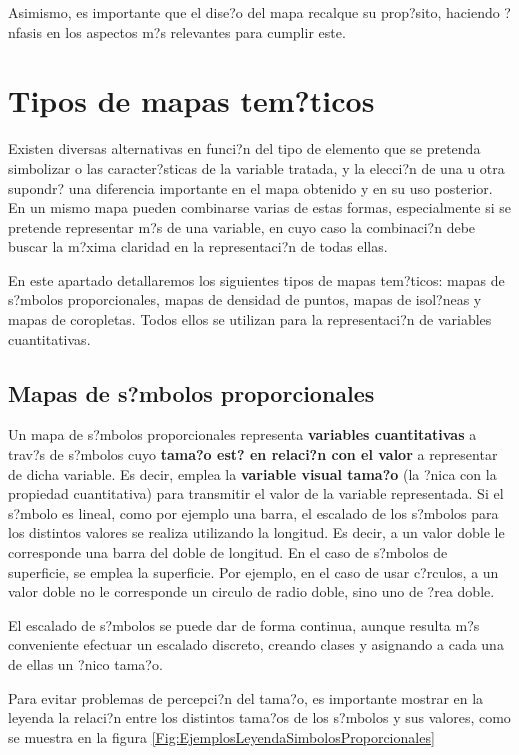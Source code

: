 Asimismo, es importante que el dise?o del mapa recalque su prop?sito, haciendo ?nfasis en los aspectos m?s relevantes para cumplir este.


\section{Tipos de mapas tem?ticos}

Existen diversas alternativas en funci?n del tipo de elemento que se pretenda simbolizar o las caracter?sticas de la variable tratada, y la elecci?n de una u otra supondr? una diferencia importante en el mapa obtenido y en su uso posterior. En un mismo mapa pueden combinarse varias de estas formas, especialmente si se pretende representar m?s de una variable, en cuyo caso la combinaci?n debe buscar la m?xima claridad en la representaci?n de todas ellas.

En este apartado detallaremos los siguientes tipos de mapas tem?ticos: mapas de s?mbolos proporcionales, mapas de densidad de puntos, mapas de isol?neas y mapas de coropletas. Todos ellos se utilizan para la representaci?n de variables cuantitativas.


\subsection{Mapas de s?mbolos proporcionales}

Un mapa de s?mbolos proporcionales representa \textbf{variables cuantitativas} a trav?s de s?mbolos cuyo \textbf{tama?o est? en relaci?n con el valor} a representar de dicha variable. Es decir, emplea la \textbf{variable visual tama?o} (la ?nica con la propiedad cuantitativa) para transmitir el valor de la variable representada. Si el s?mbolo es lineal, como por ejemplo una barra, el escalado de los s?mbolos para los distintos valores se realiza utilizando la longitud. Es decir, a un valor doble le corresponde una barra del doble de longitud. En el caso de s?mbolos de superficie, se emplea la superficie. Por ejemplo, en el caso de usar c?rculos, a un valor doble no le corresponde un circulo de radio doble, sino uno de ?rea doble.

El escalado de s?mbolos se puede dar de forma continua, aunque resulta m?s conveniente efectuar un escalado discreto, creando clases y asignando a cada una de ellas un ?nico tama?o. 

Para evitar problemas de percepci?n del tama?o, es importante mostrar en la leyenda la relaci?n entre los distintos tama?os de los s?mbolos y sus valores, como se muestra en la figura \ref{Fig:EjemplosLeyendaSimbolosProporcionales}

